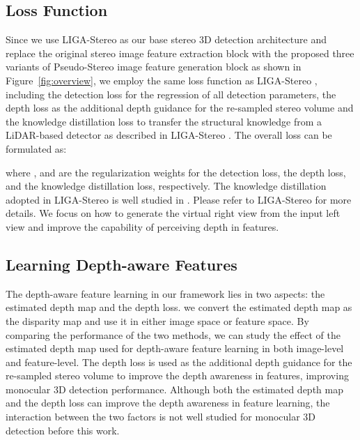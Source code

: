 \documentclass[10pt,twocolumn,letterpaper]{article}
\begin{document}
\subsection{Loss Function}
\label{sec:loss}
Since we use LIGA-Stereo \cite{guo2021liga} as our base stereo 3D detection architecture and replace the original stereo image feature extraction block with the proposed three variants of Pseudo-Stereo image feature generation block as shown in Figure~\ref{fig:overview}, we employ the same loss function as LIGA-Stereo \cite{guo2021liga}, including the detection loss  for the regression of all detection parameters, the depth loss  as the additional depth guidance for the re-sampled stereo volume  and the knowledge distillation loss  to transfer the structural knowledge from a LiDAR-based detector as described in LIGA-Stereo \cite{guo2021liga}. The overall loss can be formulated as:

where , and  are the regularization weights for the detection loss, the depth loss, and the knowledge distillation loss, respectively. The knowledge distillation adopted in LIGA-Stereo is well studied in \cite{guo2021liga}. Please refer to LIGA-Stereo \cite{guo2021liga} for more details. We focus on how to generate the virtual right view from the input left view and improve the capability of perceiving depth in features.  
\subsection{Learning Depth-aware Features}\label{sec:depth_loss}
The depth-aware feature learning in our framework lies in two aspects: the estimated depth map and the depth loss. we convert the estimated depth map as the disparity map and use it in either image space or feature space. By comparing the performance of the two methods, we can study the effect of the estimated depth map used for depth-aware feature learning in both image-level and feature-level. The depth loss  is used as the additional depth guidance for the re-sampled stereo volume  to improve the depth awareness in features, improving monocular 3D detection performance. Although both the estimated depth map and the depth loss can improve the depth awareness in feature learning, the interaction between the two factors is not well studied for monocular 3D detection before this work.  
\end{document}
